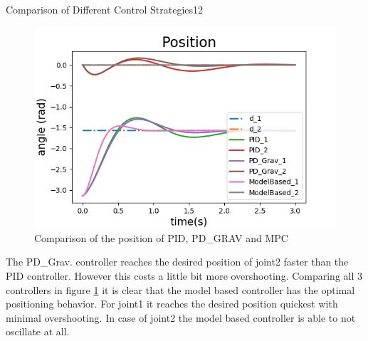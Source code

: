 \begin{questions}
\begin{question}{Comparison of Different Control Strategies}{12}
\begin{answer}
\begin{minipage}{0.7\textwidth}
	\begin{figure}[H]
		\includegraphics[width=1\textwidth]{img/2cpos2.png} 
		\caption{\label{fig:2cpos2} Comparison of the position of PID, PD\_GRAV and MPC}
	\end{figure}
\end{minipage} \hfill
\begin{minipage}{0.25\textwidth}
	The PD\_Grav. controller reaches the desired position of joint2 faster than the PID controller. However this costs a little bit more overshooting. Comparing all 3 controllers in figure \ref{fig:2cpos2} it is clear that the model based controller has the optimal positioning behavior. For joint1 it reaches the desired position quickest with minimal overshooting. In case of joint2 the model based controller is able to not oscillate at all.
\end{minipage}


\end{answer}
\end{question}
\end{questions}
